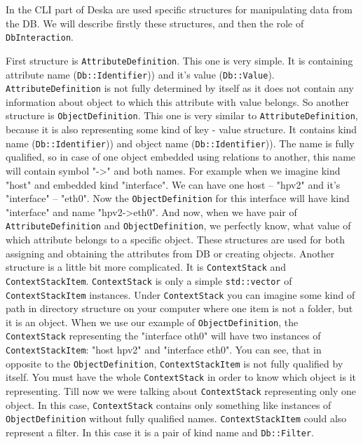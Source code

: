 \documentclass[deska]{subfiles}
\begin{document}
In the CLI part of Deska are used specific structures for manipulating data from the DB. We will describe firstly 
these structures, and then the role of {\tt DbInteraction}.

First structure is {\tt AttributeDefinition}. This one is very simple. It is containing attribute name ({\tt Db::Identifier}))
and it's value ({\tt Db::Value}). {\tt AttributeDefinition} is not fully determined by itself as it 
does not contain any information about object to which this attribute with value belongs. So another structure is {\tt ObjectDefinition}.
This one is very similar to {\tt AttributeDefinition}, because it is also representing some kind of 
key - value structure. It contains kind name ({\tt Db::Identifier})) and object name ({\tt Db::Identifier})). The name 
is fully qualified, so in case of one object embedded using relations to another, this name will contain symbol "->" 
and both names. For example when we imagine kind "host" and embedded kind "interface". We can have one host -- "hpv2" 
and it's "interface" -- "eth0". Now the {\tt ObjectDefinition} for this interface will have kind "interface" and name 
"hpv2->eth0". And now, when we have pair of {\tt AttributeDefinition} and {\tt ObjectDefinition}, we perfectly know, 
what value of which attribute belongs to a specific object. These structures are used for both assigning and obtaining 
the attributes from DB or creating objects. Another structure is a little bit more complicated. It is {\tt ContextStack}
and {\tt ContextStackItem}. {\tt ContextStack} is only a simple {\tt std::vector} of {\tt ContextStackItem} instances.
Under {\tt ContextStack} you can imagine some kind of path in directory structure on your computer where one item is not
a folder, but it is an object. When we use our example of {\tt ObjectDefinition}, the {\tt ContextStack} representing
the "interface oth0" will have two instances of {\tt ContextStackItem}: "host hpv2" and "interface eth0". You can see,
that in opposite to the {\tt ObjectDefinition}, {\tt ContextStackItem} is not fully qualified by itself. You must have
the whole {\tt ContextStack} in order to know which object is it representing. Till now we were talking about
{\tt ContextStack} representing only one object. In this case, {\tt ContextStack} contains only something like
instances of {\tt ObjectDefinition} without fully qualified names. {\tt ContextStackItem} could also represent a filter.
In this case it is a pair of kind name and {\tt Db::Filter}.
\end{document}
